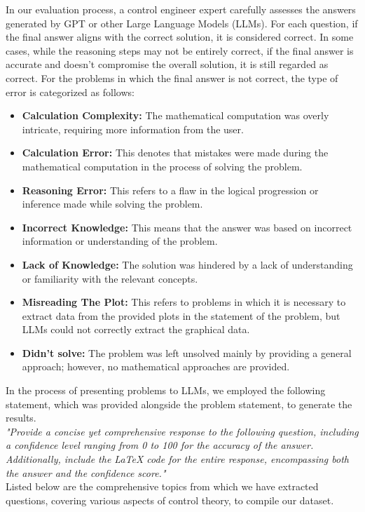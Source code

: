 \documentclass[12pt]{article}
\begin{document}
In our evaluation process, a control engineer expert carefully assesses the answers generated by GPT or other Large Language Models (LLMs). For each question, if the final answer aligns with the correct solution, it is considered correct. In some cases, while the reasoning steps may not be entirely correct, if the final answer is accurate and doesn't compromise the overall solution, it is still regarded as correct. For the problems in which the final answer is not correct, the type of error is categorized as follows:
\begin{itemize}
    \item \textbf{Calculation Complexity:} The mathematical computation was overly intricate, requiring more information from the user.
    \item \textbf{Calculation Error:} This denotes that mistakes were made during the mathematical computation in the process of solving the problem.
    \item \textbf{Reasoning Error:} This refers to a flaw in the logical progression or inference made while solving the problem.
    \item \textbf{Incorrect Knowledge:} This means that the answer was based on incorrect information or understanding of the problem.
    \item \textbf{Lack of Knowledge:} The solution was hindered by a lack of understanding or familiarity with the relevant concepts.
    \item \textbf{Misreading The Plot:} This refers to problems in which it is necessary to extract data from the provided plots in the statement of the problem, but LLMs could not correctly extract the graphical data.
    \item \textbf{Didn't solve:} The problem was left unsolved mainly by providing a general approach; however, no mathematical approaches are provided.
\end{itemize}

In the process of presenting problems to LLMs, we employed the following statement, which was provided alongside the problem statement, to generate the results.\\
\textit{"Provide a concise yet comprehensive response to the following question, including a confidence level ranging from 0 to 100 for the accuracy of the answer. Additionally, include the LaTeX code for the entire response, encompassing both the answer and the confidence score."}\\
\clearpage
Listed below are the comprehensive topics from which we have extracted questions, covering various aspects of control theory, to compile our dataset.
\end{document}
